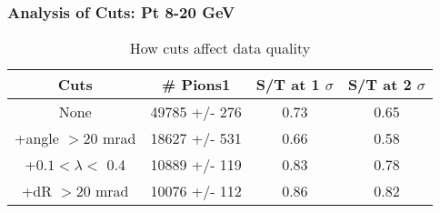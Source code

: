 \frame
{
\frametitle{Analysis of Cuts: Pt 8-20 GeV}
\begin{table}
\caption{How cuts affect data quality}
\centering
\begin{tabular}{c c c c}
\hline\hline
Cuts & \# Pions1 & S/T at 1 $\sigma$ & S/T at 2 $\sigma$ \\ [0.5ex]
\hline
None & 49785 +/-  276 & 0.73 & 0.65 \\ %
+angle $> 20$ mrad & 18627 +/-  531 & 0.66 & 0.58 \\ %
+$0.1 < \lambda <$ 0.4 & 10889 +/-  119 & 0.83 & 0.78 \\ %
+dR $> 20$ mrad & 10076 +/-  112 & 0.86 & 0.82 \\ %
[1ex]
\hline
\end{tabular}
\label{table:nonlin}
\end{table}
}
